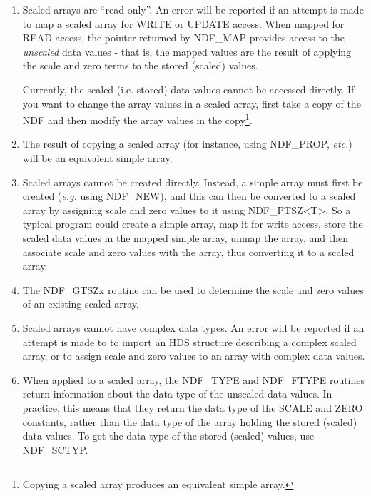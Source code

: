 \begin{enumerate}

\item Scaled arrays are ``read-only''. An error will be reported if an
attempt is made to map a scaled array for WRITE or UPDATE access. When
mapped for READ access, the pointer returned by NDF\_MAP provides access
to the \emph{unscaled} data values - that is, the mapped values are the
result of applying the scale and zero terms to the stored (scaled) values.

Currently, the scaled (i.e. stored) data values cannot be accessed
directly. If you want to change the array values in a scaled array, first
take a copy of the NDF and then modify the array values in the
copy\footnote{Copying a scaled array produces an equivalent simple
array.}.

\item The result of copying a scaled array (for instance, using
NDF\_PROP, \emph{etc.}) will be an equivalent simple array.

\item Scaled arrays cannot be created directly. Instead, a simple array
must first be created (\emph{e.g.} using NDF\_NEW), and this can then be
converted to a scaled array by assigning scale and zero values to it
using NDF\_PTSZ<T>. So a typical program could create a simple array, map
it for write access, store the scaled data values in the mapped simple
array, unmap the array, and then associate scale and zero values with the
array, thus converting it to a scaled array.

\item The NDF\_GTSZx routine can be used to determine the scale and zero
values of an existing scaled array.

\item Scaled arrays cannot have complex data types. An error will be
reported if an attempt is made to to import an HDS structure describing a
complex scaled array, or to assign scale and zero values to an array with
complex data values.

\item When applied to a scaled array, the NDF\_TYPE and NDF\_FTYPE routines 
return information about the data type of the unscaled data values. In
practice, this means that they return the data type of the SCALE and ZERO
constants, rather than the data type of the array holding the stored
(scaled) data values. To get the data type of the stored (scaled) values,
use NDF\_SCTYP.

\end{enumerate}



